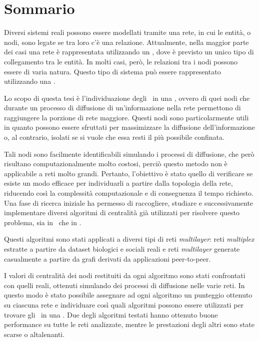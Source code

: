 \setlength{\parskip}{1em}

\chapter*{Sommario} %
\label{sommario}


Diversi sistemi reali possono essere modellati tramite una rete, in cui
le entità, o nodi, sono legate se tra loro c'è una relazione.
Attualmente, nella maggior parte dei casi una rete è rappresentata utilizzando 
un \grafo, dove è previsto un unico tipo di collegamento tra le entità.
In molti casi, però, le relazioni tra i nodi possono essere di varia natura. 
Questo tipo di sistema può essere rappresentato utilizzando una 
\muln.

Lo scopo di questa tesi è l'individuazione degli \infsp\ in una \muln, 
ovvero di quei nodi che durante un processo di diffusione di 
un'informazione nella rete permettono di raggiungere la porzione di rete maggiore. 
Questi nodi sono particolarmente utili in quanto possono essere sfruttati per 
massimizzare la diffusione dell'informazione o, al contrario, 
isolati se si vuole che essa resti il più possibile confinata.

Tali nodi sono facilmente identificabili simulando i processi di diffusione, 
che però risultano computazionalmente molto costosi, perciò questo metodo non 
è applicabile a reti molto grandi.
Pertanto, l'obiettivo è stato quello di verificare se esiste un modo efficace per 
individuarli a partire dalla topologia della rete, riducendo così la complessità computazionale 
e di conseguenza il tempo richiesto.
Una fase di ricerca iniziale ha permesso di raccogliere, studiare 
e successivamente implementare diversi 
algoritmi di centralità già utilizzati per risolvere questo problema, 
sia in \grafi\ che in \mulns.

Questi algoritmi sono stati applicati a diversi tipi di reti \textit{multilayer}:
reti \textit{multiplex} estratte a partire da dataset biologici e 
sociali reali e reti \textit{multilayer} generate casualmente 
a partire da grafi derivati da applicazioni peer-to-peer.

I valori di centralità dei nodi restituiti da ogni algoritmo sono stati 
confrontati con quelli reali, ottenuti simulando dei processi di diffusione
nelle varie reti. In questo modo è stato possibile assegnare ad ogni algoritmo
un punteggio ottenuto su ciascuna rete e individuare così quali algoritmi
possono essere utilizzati per trovare gli \infsp\ in una \muln.
Due degli algoritmi testati hanno ottenuto buone performance su tutte le 
reti analizzate, mentre le prestazioni degli altri sono state scarse o altalenanti.

